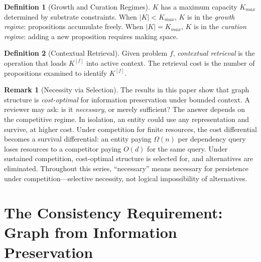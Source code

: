 \documentclass[11pt]{article}
\theoremstyle{definition}
\newtheorem{definition}{Definition}
\newtheorem*{remark}{Remark}
\begin{document}
\begin{definition}[Growth and Curation Regimes]
\label{def:regimes}
$K$ has a maximum capacity $K_{max}$ determined by substrate constraints.
When $|K| < K_{max}$, $K$ is in the \emph{growth regime}: propositions
accumulate freely. When $|K| = K_{max}$, $K$ is in the \emph{curation
regime}: adding a new proposition requires making space.
\end{definition}

\begin{definition}[Contextual Retrieval]
\label{def:retrieval}
Given problem $f$, \emph{contextual retrieval} is the operation that
loads $K^{[f]}$ into active context. The retrieval cost is the number of
propositions examined to identify $K^{[f]}$.
\end{definition}

\begin{remark}[Necessity via Selection]
\label{rem:necessity}
The results in this paper show that graph structure is
\emph{cost-optimal} for information preservation under bounded context.
A reviewer may ask: is it \emph{necessary}, or merely sufficient? The
answer depends on the competitive regime. In isolation, an entity could
use any representation and survive, at higher cost. Under competition
for finite resources, the cost differential becomes a survival
differential: an entity paying $\Omega(n)$ per dependency query loses
resources to a competitor paying $O(d)$ for the same query. Under
sustained competition, cost-optimal structure is selected for, and
alternatives are eliminated. Throughout this series, ``necessary'' means
necessary for persistence under competition---selective necessity, not
logical impossibility of alternatives.
\end{remark}

\section{The Consistency Requirement: Graph from Information Preservation}
\label{sec:info}
\end{document}
